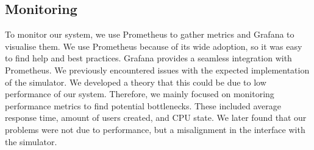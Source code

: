 \subsection{Monitoring}

To monitor our system, we use Prometheus to gather metrics and Grafana to visualise them. We use Prometheus because of its wide adoption, so it was easy to find help and best practices. Grafana provides a seamless integration with Prometheus. We previously encountered issues with the expected implementation of the simulator. We developed a theory that this could be due to low performance of our system. Therefore, we mainly focused on monitoring performance metrics to find potential bottlenecks. These included average response time, amount of users created, and CPU state. We later found that our problems were not due to performance, but a misalignment in the interface with the simulator.
